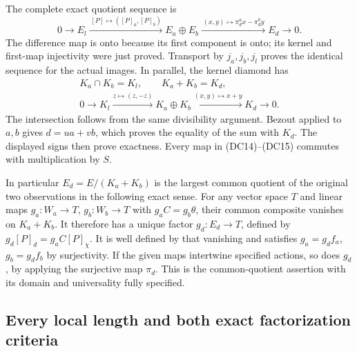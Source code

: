 \documentclass{article}
\begin{document}
The complete exact quotient sequence is
\[
 0\longrightarrow E_l
 \xrightarrow{\, [P]\mapsto([P]_a,[P]_b)\,}
 E_a\oplus E_b
 \xrightarrow{\, (x,y)\mapsto\pi_d^a x-\pi_d^b y\,}
 E_d\longrightarrow0 .
 \tag{DC14}
\]
The difference map is onto because its first component is onto;
its kernel and first-map injectivity were just proved.  Transport by
$j_a,j_b,j_l$ proves the identical sequence for the actual images.
In parallel, the kernel diamond has
\[
 \begin{gathered}
 K_a\cap K_b=K_l,\qquad K_a+K_b=K_d,\\
 0\longrightarrow K_l
 \xrightarrow{z\mapsto(z,-z)}K_a\oplus K_b
 \xrightarrow{(x,y)\mapsto x+y}K_d\longrightarrow0 .
 \end{gathered}
 \tag{DC15}
\]
The intersection follows from the same divisibility argument.
Bezout applied to $a,b$ gives $d=ua+vb$, which proves the equality
of the sum with $K_d$.  The displayed signs then prove exactness.
Every map in (DC14)--(DC15) commutes with multiplication by $S$.

In particular $E_d=E/(K_a+K_b)$ is the largest common quotient of
the original two observations in the following exact sense.
For any vector space $T$ and linear maps $g_a:W_a\to T$,
$g_b:W_b\to T$ with $g_aC=g_b\theta$, their common composite
vanishes on $K_a+K_b$.  It therefore has a unique factor
$g_d:E_d\to T$, defined by $g_d[P]_d=g_aC[P]_\chi$.
It is well defined by that vanishing and satisfies
$g_a=g_df_a$, $g_b=g_df_b$ by surjectivity.  If the given maps
intertwine specified actions, so does $g_d$, by applying the
surjective map $\pi_d$.  This is the common-quotient assertion
with its domain and universality fully specified.

\subsection{Every local length and both exact factorization criteria}
\end{document}

